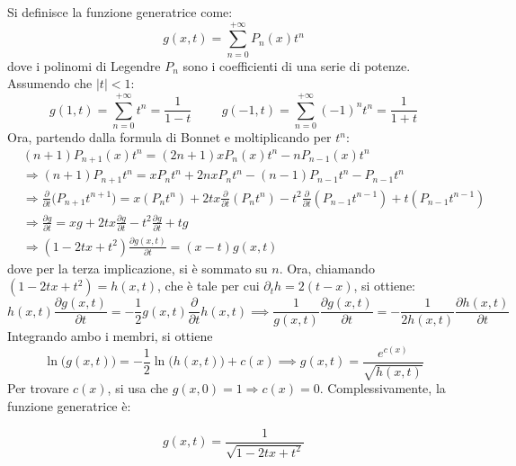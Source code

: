 \documentclass[11pt, a4paper]{scrartcl}
\theoremstyle{definition}
\numberwithin{esempio}{section}
\theoremstyle{definition}
\numberwithin{obs}{section}
\numberwithin{nota}{section}
\newenvironment{boxenv}[1][]{
    \begin{eqbox}[#1]
    }{
   \end{eqbox}
}
\numberwithin{equation}{subsection}
\begin{document}
Si definisce la funzione generatrice come:
\[
g(x,t) = \sum_{n=0}^{+\infty} P_n(x) t^n
\] 
dove i polinomi di Legendre $P_n$ sono i coefficienti di una serie di potenze.
Assumendo che $\lvert t \rvert < 1$:
\[
g(1,t) = \sum_{n=0}^{+\infty} t^n = \frac{1}{1-t}\hspace{1cm} g(-1,t) = \sum_{n=0}^{+\infty} (-1)^n t^n = \frac{1}{1+t}
\] 
Ora, partendo dalla formula di Bonnet e moltiplicando per $t^n$:
\[
\begin{split}
	&(n+1) P_{n+1} (x) t^n= (2n+1) x P_n(x) t^n- n P_{n-1} (x)t^n\\
	&\Rightarrow (n+1) P_{n+1} t^n = x P_n t^n + 2nx P_n t^n - (n-1) P_{n-1} t^n - P_{n-1} t^n\\
	&\Rightarrow \frac{\partial }{\partial t} \big(P_{n+1} t^{n+1} \big) = x (P_nt^n) + 2tx\frac{\partial }{\partial t} (P_nt^n) - t^2 \frac{\partial }{\partial t} (P_{n-1} t^{n-1} ) + t(P_{n-1} t^{n-1} )\\
	&\Rightarrow \frac{\partial g}{\partial t}  = xg + 2tx \frac{\partial g}{\partial t}  - t^2 \frac{\partial g}{\partial t} + tg\\
	&\Rightarrow (1-2tx+t^2) \frac{\partial g(x,t)}{\partial t} = (x-t) g(x,t)
\end{split}
\] 
dove per la terza implicazione, si \`e sommato su $n$. 
Ora, chiamando $(1-2tx+t^2) = h(x,t)$, che \`e tale per cui $\partial _t h = 2(t-x)$, si ottiene:
\[
	h(x,t) \frac{\partial g(x,t)}{\partial t} = -\frac{1}{2}g(x,t)\frac{\partial }{\partial t} h(x,t) \implies \frac{1}{g(x,t)}\frac{\partial g(x,t)}{\partial t} = -\frac{1}{2h(x,t)} \frac{\partial h(x,t)}{\partial t} 
\] 
Integrando ambo i membri, si ottiene
\[
	\ln \big(g(x,t)\big) = - \frac{1}{2} \ln\big(h(x,t)\big) + c(x) \implies g(x,t) = \frac{e^{c(x)} }{\sqrt{h(x,t)} }
\] 
Per trovare $c(x)$, si usa che $g(x,0) = 1 \Rightarrow c(x) = 0$. 
Complessivamente, la funzione generatrice \`e:
\begin{boxenv}[]
\begin{equation}
	g(x,t) = \frac{1}{\sqrt{1-2tx+t^2} }
\end{equation}
\end{boxenv}
\end{document}
